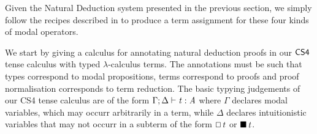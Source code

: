 Given the Natural Deduction system presented in the previous section,
we simply follow the recipes described in \cite{barber1997} to produce
a term assignment for these four kinds of modal operators.

We start by giving a calculus for annotating natural deduction proofs
in our $\sf{CS4}$ tense calculus with typed $\lambda$-calculus terms. The
annotations must be such that types correspond to modal propositions,
terms correspond to proofs and proof normalisation corresponds to term
reduction. The basic typying judgements of our CS4 tense calculus are
of the form $\Gamma  ;  \Delta  \vdash  \mathit{t}  :  \mathit{A}$ where $\Gamma$ declares modal
variables, which may occurr arbitrarily in a term, while $\Delta$
declares intuitionistic variables that may not occurr in a subterm of
the form $\oblong \, \mathit{t}$ or $\blacksquare \, \mathit{t}$.

